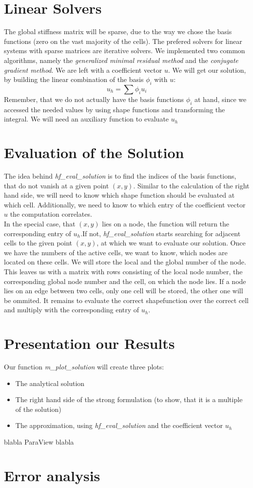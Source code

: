 \documentclass[a4paper,12pt]{article}
\begin{document}
\section{Linear Solvers}
The global stiffness matrix will be sparse, due to the way we chose the basis functions (zero on the vast majority of the cells). The prefered solvers for linear systems with sparse matrices are iterative solvers. We implemented two common algorithms, namely the \textit{generalized minimal residual method} and the \textit{conjugate gradient method}. 
We are left with a coefficient vector $u$. We will get our solution, by building the linear combination of the basis ${\phi_i}$ with $u$: 
\[u_h = \sum \phi_i u_i\]
Remember, that we do not actually have the basis functions $\phi_i$ at hand, since we accessed the needed values by using shape functions and transforming the integral. We will need an auxiliary function to evaluate $u_h$

\section{Evaluation of the Solution}
The idea behind \textit{hf\_eval\_solution} is to find the indices of the basis functions, that do not vanish at a given point $(x,y)$. Similar to the calculation of the right hand side, we will need to know which shape function should be evaluated at which cell. Additionally, we need to know to which entry of the coefficient vector $u$ the computation correlates.\\
In the special case, that $(x,y)$ lies on a node, the function will return the corresponding entry of $u_h$.If not, \textit{hf\_eval\_solution} starts searching for adjacent cells to the given point $(x,y)$, at which we want to evaluate our solution. Once we have the numbers of the active cells, we want to know, which nodes are located on these cells. We will store the local and the global number of the node. This leaves us with a matrix with rows consisting of the local node number, the corresponding global node number and the cell, on which the node lies. If a node lies on an edge between two cells, only one cell will be stored, the other one will be ommited. It remains to evaluate the correct shapefunction over the correct cell and multiply with the corresponding entry of $u_h$.

\section{Presentation our Results}
Our function \textit{m\_plot\_solution} will create three plots:
\begin{itemize}
\item The analytical solution
\item The right hand side of the strong formulation (to show, that it is a multiple of the solution)
\item The approximation, using \textit{hf\_eval\_solution} and the coefficient vector $u_h$
\end{itemize}

blabla ParaView blabla

\section{Error analysis}
\end{document}
